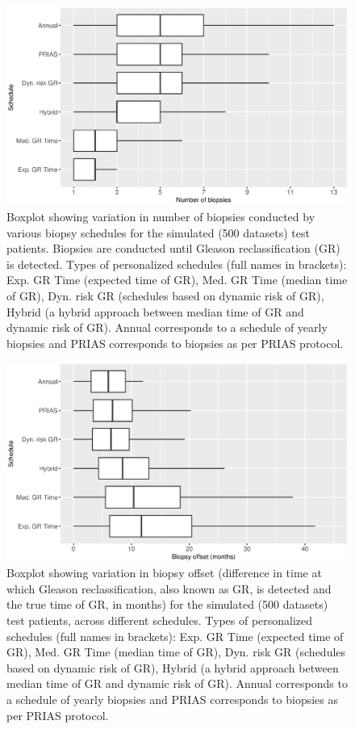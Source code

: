 \clearpage
    \begin{figure}[!htb]
    \centerline{\includegraphics[width=\columnwidth]{../images/sim_study/nbBoxPlot_all.eps}}
    \caption{Boxplot showing variation in number of biopsies conducted by various biopsy schedules for the simulated (500 datasets) test patients. Biopsies are conducted until Gleason reclassification (GR) is detected. Types of personalized schedules (full names in brackets): Exp. GR Time (expected time of GR), Med. GR Time (median time of GR), Dyn. risk GR (schedules based on dynamic risk of GR), Hybrid (a hybrid approach between median time of GR and dynamic risk of GR). Annual corresponds to a schedule of yearly biopsies and PRIAS corresponds to biopsies as per PRIAS protocol.}
    \label{fig : nbBoxPlot_all}
    \end{figure}

\clearpage
    \begin{figure}[!htb]
    \centerline{\includegraphics[width=\columnwidth]{../images/sim_study/offsetBoxPlot_all.eps}}
    \caption{Boxplot showing variation in biopsy offset (difference in time at which Gleason reclassification, also known as GR, is detected and the true time of GR, in months) for the simulated (500 datasets) test patients, across different schedules. Types of personalized schedules (full names in brackets): Exp. GR Time (expected time of GR), Med. GR Time (median time of GR), Dyn. risk GR (schedules based on dynamic risk of GR), Hybrid (a hybrid approach between median time of GR and dynamic risk of GR). Annual corresponds to a schedule of yearly biopsies and PRIAS corresponds to biopsies as per PRIAS protocol.}
    \label{fig : offsetBoxPlot_all}
    \end{figure}
        
        

